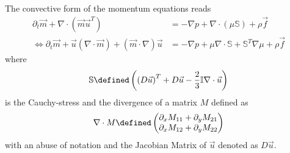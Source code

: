 
The convective form of the momentum equations reads
\begin{equation}
  \label{eq: compressible NS}
  \begin{aligned}
    \partial_t \vec{m} + \nabla \cdot (\vec{m}\vec{u}^T)
    &= - \nabla p + \nabla \cdot (\mu\mathbb{S}) + \rho \vec{f} \\
    \Leftrightarrow\partial_t \vec{m} + \vec{u}(\nabla \cdot \vec{m}) + (\vec{m} \cdot \nabla)\vec{u}
    &= - \nabla p + \mu \nabla \cdot \mathbb{S} + \mathbb{S}^T \nabla\mu + \rho \vec{f}
  \end{aligned}
\end{equation}
where
\begin{equation}
  \label{eq: S}
  \mathbb{S} \defined \left({(D\vec{u})}^T + D\vec{u} - \frac{2}{3}\mathbb{I}\nabla\cdot\vec{u} \right)
\end{equation}
is the Cauchy-stress and the divergence of a matrix $M$ defined as
\begin{equation}
  \label{eq: divergence matrix}
  \nabla \cdot M \defined
  \begin{pmatrix}
    \partial_x M_{11} + \partial_y M_{21} \\
    \partial_x M_{12} + \partial_y M_{22}
  \end{pmatrix}
\end{equation}
with an abuse of notation and the Jacobian Matrix of $\vec{u}$ denoted as $D\vec{u}$.


